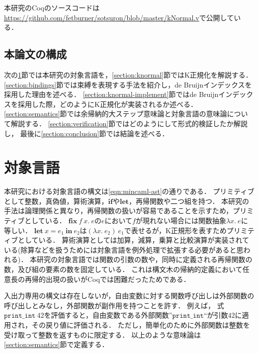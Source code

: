 \documentclass[T]{compsoft}
\newcommand{\keyword}[1]{\mathbf{#1}}
\newcommand{\IF}{\keyword{if}}
\newcommand{\LET}{\keyword{let}}
\newcommand{\FIX}{\keyword{fix}}
\newcommand{\IN}{\keyword{in}}
\begin{document}
本研究のCoqのソースコードは\url{https://github.com/fetburner/sotsuron/blob/master/kNormal.v}で公開している．

\subsection{本論文の構成}
次の\ref{section:target}節では本研究の対象言語を，\ref{section:knormal}節ではK正規化を解説する．
\ref{section:bindings}節では束縛を表現する手法を紹介し，de Bruijnインデックスを採用した理由を述べる．
\ref{section:knormal-implement}節ではde Bruijnインデックスを採用した際，どのようにK正規化が実装されるか述べる．
\ref{section:semantics}節では余帰納的大ステップ意味論と対象言語の意味論について解説する．
\ref{section:verification}節ではどのようにして形式的検証したか解説し，
最後に\ref{section:conclusion}節では結論を述べる．

\section{対象言語}\label{section:target}
本研究における対象言語の構文は\figurename\ref{eqn:mincaml-ast}の通りである．
プリミティブとして整数，真偽値，算術演算，$\IF$や$\LET$，再帰関数や二つ組を持つ．
本研究の手法は論理関係と異なり，再帰関数の扱いが容易であることを示すため，プリミティブとしている．
$\FIX~f~x.~e$の$e$において$f$が現れない場合には関数抽象$\lambda x.~e$に等しい．
$\LET~x=e_1~\IN~e_2$は$(\lambda x.~e_2)~e_1$で表せるが，K正規形を表すためプリミティブとしている．
算術演算としては加算，減算，乗算と比較演算が実装されている(除算などを扱うためには対象言語を例外処理で拡張する必要があると思われる)．
本研究の対象言語では関数の引数の数や，同時に定義される再帰関数の数，及び組の要素の数を固定している．
これは構文木の帰納的定義において任意長の再帰的出現の扱いがCoqでは困難だったためである．

入出力専用の構文は存在しないが，自由変数に対する関数呼び出しは外部関数の呼び出しとみなし，外部関数が副作用を持つことを許す．
例えば，%
式$\texttt{print\_int}~42$を評価すると，自由変数である外部関数''$\texttt{print\_int}$``が引数$42$に適用され，その戻り値に評価される．
ただし，簡単化のために外部関数は整数を受け取って整数を返すものに限定する．
以上のような意味論は\ref{section:semantics}節で定義する．
\end{document}
